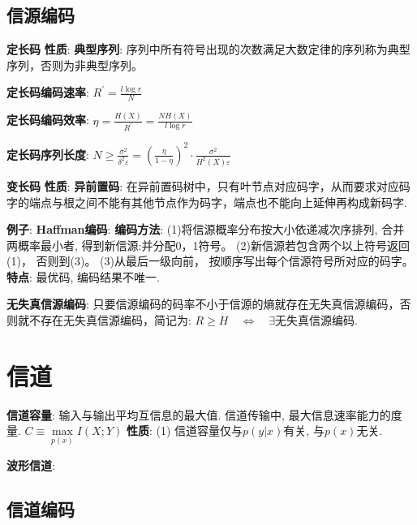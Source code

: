 \documentclass{article}
\begin{document}
    \subsection{信源编码}
        \textbf{定长码}
            \textbf{性质}:
                \textbf{典型序列}: 序列中所有符号出现的次数满足大数定律的序列称为典型序列，否则为非典型序列。

                \textbf{定长码编码速率}: $R^{\prime}=\frac{l \log r}{N}$

                \textbf{定长码编码效率}: $\eta=\frac{H(X)}{R^{\prime}}=\frac{N H(X)}{l \log r}$
                
                \textbf{定长码序列长度}: $N \geqslant \frac{\sigma^{2}}{\delta^{2} \varepsilon}=\left(\frac{\eta}{1-\eta}\right)^{2} \cdot \frac{\sigma^{2}}{H^{2}(X) \varepsilon}$

        \textbf{变长码}  
            \textbf{性质}:
                \textbf{异前置码}: 在异前置码树中，只有叶节点对应码字，从而要求对应码字的端点与根之间不能有其他节点作为码字，端点也不能向上延伸再构成新码字.
                
            \textbf{例子}:
                \textbf{Haffman编码}:
                    \textbf{编码方法}:
                        (1)将信源概率分布按大小依递减次序排列, 合并两概率最小者, 得到新信源:并分配0，1符号。
                        (2)新信源若包含两个以上符号返回(1)， 否则到(3)。
                        (3)从最后一级向前， 按顺序写出每个信源符号所对应的码字。
                    \textbf{特点}:
                        最优码, 编码结果不唯一.
                    
        \textbf{无失真信源编码}: 只要信源编码的码率不小于信源的熵就存在无失真信源编码，否则就不存在无失真信源编码，简记为: $ R \ge H \quad \Leftrightarrow  \quad \exists \text{无失真信源编码}$.
        

\section{信道}
    \textbf{信道容量}: 输入与输出平均互信息的最大值. 信道传输中, 最大信息速率能力的度量. $C \equiv \max\limits_{p(x)} I(X ; Y)$
        \textbf{性质}:
            (1) 信道容量仅与$p(y|x)$有关, 与$p(x)$无关.

    \textbf{波形信道}: 

    \subsection{信道编码}
        
\end{document}
